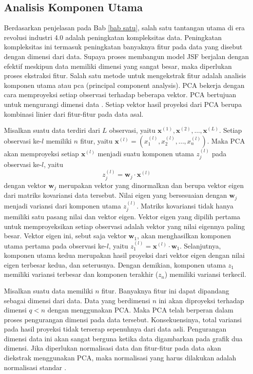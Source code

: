 \subsection{Analisis Komponen Utama}
\noindent Berdasarkan penjelasan pada Bab \ref{bab satu}, salah satu tantangan utama di era revolusi industri 4.0 adalah peningkatan kompleksitas data. Peningkatan kompleksitas ini termasuk peningkatan banyaknya fitur pada data yang disebut dengan dimensi dari data. Supaya proses membangun model JSF berjalan dengan efektif meskipun data memiliki dimensi yang sangat besar, maka diperlukan proses ekstraksi fitur. Salah satu metode untuk mengekstrak fitur adalah analisis komponen utama atau \gls{pca} (principal component analysis). PCA bekerja dengan cara memproyeksi setiap observasi terhadap beberapa vektor. PCA bertujuan untuk mengurangi dimensi data \cite{rogers}. Setiap vektor hasil proyeksi dari PCA berupa kombinasi linier dari fitur-fitur pada data asal.

\noindent Misalkan suatu data terdiri dari $L$ observasi, yaitu $\mathbf{x}^{(1)},\mathbf{x}^{(2)},\ldots,\mathbf{x}^{(L)}$. Setiap observasi ke-$l$ memiliki $n$ fitur, yaitu $\mathbf{x}^{(l)} = (x^{(l)}_1, x^{(l)}_2, \ldots, x^{(l)}_n)$. Maka PCA akan memproyeksi setiap $\mathbf{x}^{(l)}$ menjadi suatu komponen utama $z^{(l)}_j$ pada observasi ke-$l$, yaitu
\[ z^{(l)}_j = \mathbf{w}_j \cdot \mathbf{x}^{(l)}\]
dengan vektor $\mathbf{w}_j$ merupakan vektor yang dinormalkan dan berupa vektor eigen dari matriks kovariansi data tersebut. Nilai eigen yang bersesuaian dengan $\mathbf{w}_j$ menjadi variansi dari komponen utama $z^{(l)}_j$. Matriks kovariansi tidak hanya memiliki satu pasang nilai dan vektor eigen. Vektor eigen yang dipilih pertama untuk memproyeksikan setiap observasi adalah vektor yang nilai eigennya paling besar. Vektor eigen ini, sebut saja vektor $\mathbf{w}_1$, akan menghasilkan komponen utama pertama pada observasi ke-$l$, yaitu $z^{(l)}_1 = \mathbf{x}^{(l)}\cdot \mathbf{w}_1$. Selanjutnya, komponen utama kedua merupakan hasil proyeksi dari vektor eigen dengan nilai eigen terbesar kedua, dan seterusnya.  Dengan demikian, komponen utama $z_1$ memiliki variansi terbesar dan komponen terakhir ($z_n$) memiliki variansi terkecil.

\noindent Misalkan suatu data memiliki $n$ fitur. Banyaknya fitur ini dapat dipandang sebagai dimensi dari data. Data yang berdimensi $n$ ini akan diproyeksi terhadap dimensi $q<n$ dengan menggunakan PCA. Maka PCA telah berperan dalam proses pengurangan dimensi pada data tersebut. Konsekuensinya, total variansi pada hasil proyeksi tidak terserap sepenuhnya dari data asli. Pengurangan dimensi data ini akan sangat berguna ketika data digambarkan pada grafik dua dimensi. Jika diperlukan normalisasi data dan fitur-fitur pada data akan diekstrak menggunakan PCA, maka normalisasi yang harus dilakukan adalah normalisasi standar \cite{rogers}.

